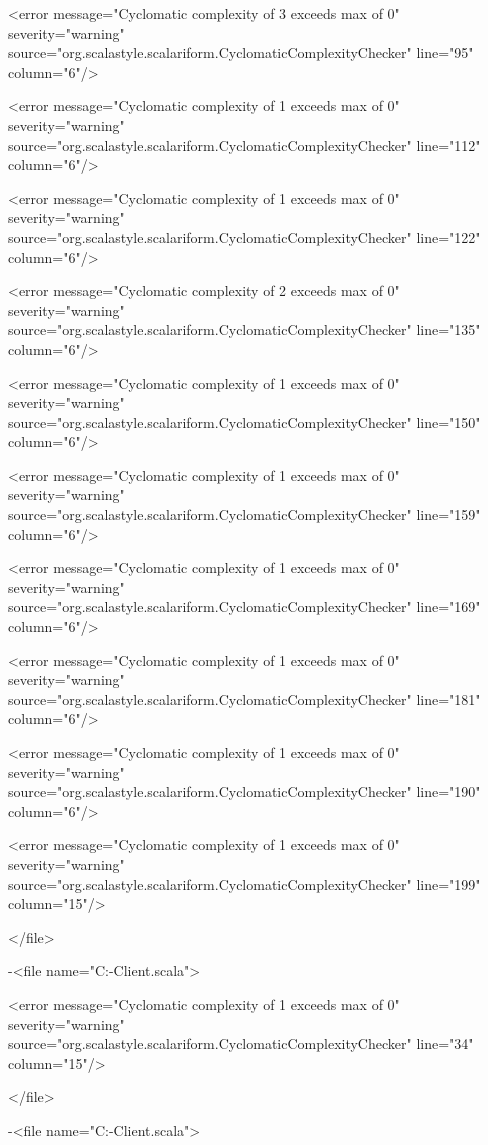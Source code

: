 \documentclass{scalatekids-article}
\begin{document}
<error message="Cyclomatic complexity of 3 exceeds max of 0" severity="warning" source="org.scalastyle.scalariform.CyclomaticComplexityChecker" line="95" column="6"/>

<error message="Cyclomatic complexity of 1 exceeds max of 0" severity="warning" source="org.scalastyle.scalariform.CyclomaticComplexityChecker" line="112" column="6"/>

<error message="Cyclomatic complexity of 1 exceeds max of 0" severity="warning" source="org.scalastyle.scalariform.CyclomaticComplexityChecker" line="122" column="6"/>

<error message="Cyclomatic complexity of 2 exceeds max of 0" severity="warning" source="org.scalastyle.scalariform.CyclomaticComplexityChecker" line="135" column="6"/>

<error message="Cyclomatic complexity of 1 exceeds max of 0" severity="warning" source="org.scalastyle.scalariform.CyclomaticComplexityChecker" line="150" column="6"/>

<error message="Cyclomatic complexity of 1 exceeds max of 0" severity="warning" source="org.scalastyle.scalariform.CyclomaticComplexityChecker" line="159" column="6"/>

<error message="Cyclomatic complexity of 1 exceeds max of 0" severity="warning" source="org.scalastyle.scalariform.CyclomaticComplexityChecker" line="169" column="6"/>

<error message="Cyclomatic complexity of 1 exceeds max of 0" severity="warning" source="org.scalastyle.scalariform.CyclomaticComplexityChecker" line="181" column="6"/>

<error message="Cyclomatic complexity of 1 exceeds max of 0" severity="warning" source="org.scalastyle.scalariform.CyclomaticComplexityChecker" line="190" column="6"/>

<error message="Cyclomatic complexity of 1 exceeds max of 0" severity="warning" source="org.scalastyle.scalariform.CyclomaticComplexityChecker" line="199" column="15"/>

</file>


-<file name="C:\Users\Davide\Documents\GitHub\Actorbase-Client\src\main\scala\com\actorbase\cli\views\ResultView.scala">

<error message="Cyclomatic complexity of 1 exceeds max of 0" severity="warning" source="org.scalastyle.scalariform.CyclomaticComplexityChecker" line="34" column="15"/>

</file>


-<file name="C:\Users\Davide\Documents\GitHub\Actorbase-Client\src\main\scala\com\actorbase\cli\views\ActorbasePrompt.scala">
\end{document}
